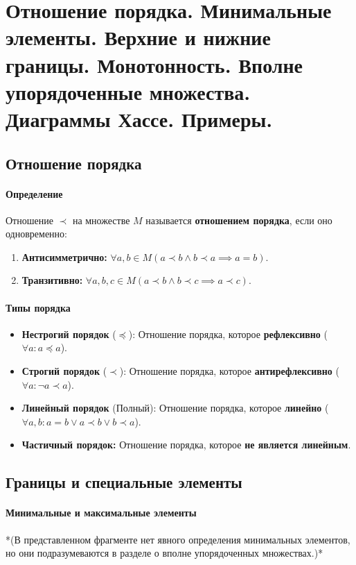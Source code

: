 \section{Отношение порядка. Минимальные элементы. Верхние и нижние границы. Монотонность. Вполне упорядоченные множества. Диаграммы Хассе. Примеры.}


\subsection*{Отношение порядка}

\paragraph{Определение}
Отношение $\prec$ на множестве $M$ называется \textbf{отношением порядка}, если оно одновременно:
\begin{enumerate}
    \item \textbf{Антисимметрично:} $\forall a, b \in M (a \prec b \land b \prec a \implies a = b)$.
    \item \textbf{Транзитивно:} $\forall a, b, c \in M (a \prec b \land b \prec c \implies a \prec c)$.
\end{enumerate}

\paragraph{Типы порядка}
\begin{itemize}
    \item \textbf{Нестрогий порядок} ($\preceq$): Отношение порядка, которое \textbf{рефлексивно} ($\forall a: a \preceq a$).
    \item \textbf{Строгий порядок} ($\prec$): Отношение порядка, которое \textbf{антирефлексивно} ($\forall a: \neg a \prec a$).
    \item \textbf{Линейный порядок} (Полный): Отношение порядка, которое \textbf{линейно} ($\forall a, b: a = b \lor a \prec b \lor b \prec a$).
    \item \textbf{Частичный порядок:} Отношение порядка, которое \textbf{не является линейным}.
\end{itemize}

\subsection*{Границы и специальные элементы}

\paragraph{Минимальные и максимальные элементы}
*(В представленном фрагменте нет явного определения минимальных элементов, но они подразумеваются в разделе о вполне упорядоченных множествах.)*

